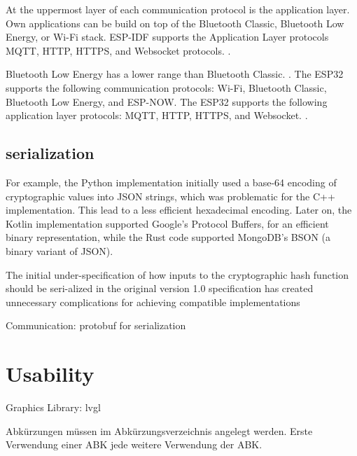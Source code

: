 At the uppermost layer of each communication protocol is the application layer. Own applications can be build on top of the Bluetooth Classic, Bluetooth Low Energy, or Wi-Fi stack. ESP-IDF supports the Application Layer protocols MQTT, HTTP, HTTPS, and Websocket protocols. \cite{esp-prog}.



Bluetooth Low Energy has a lower range than Bluetooth Classic. \cite{esp-faq}. The ESP32 supports the following communication protocols: Wi-Fi, Bluetooth Classic, Bluetooth Low Energy, and ESP-NOW. The ESP32 supports the following application layer protocols: MQTT, HTTP, HTTPS, and Websocket. \cite{esp-prog}.

\subsection{serialization}




For example, the Python implementation initially used a base-64 encoding of cryptographic values into JSON strings, which was problematic for the C++ implementation. 
This lead to a less efficient hexadecimal encoding. Later on, the Kotlin implementation supported Google’s Protocol Buffers, for an efficient binary representation, while the Rust code supported MongoDB’s BSON (a binary variant of JSON). 

The initial under-specification of how inputs to the cryptographic hash function should be seri-alized in the original version 1.0 specification has created unnecessary complications for achieving compatible implementations 

\cite[23-24]{eg-paper}


Communication: protobuf for serialization



\section{Usability}

Graphics Library: lvgl




Abkürzungen müssen im Abkürzungsverzeichnis angelegt werden.
Erste Verwendung einer \ac{ABK} jede weitere Verwendung der \ac{ABK}.

\nocite{*}

